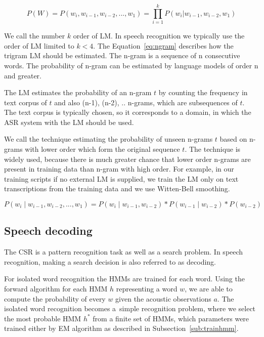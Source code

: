 {\begin{equation} \label{eq:lm}
    P(W)=P(w_i,  w_{i-1}, w_{i-2}, ..., w_1)=\prod_{i=1}^{k}{P(w_i|w_{i-1}, w_{i-2}, w_1)}
\end{equation}

We call the number $k$ order of \ac{LM}.
In speech recognition we typically use the order of \ac{LM} limited to $k<4$.
The Equation~\ref{eq:ngram} describes how the trigram \ac{LM} should be estimated.
The n-gram is a sequence of n consecutive words. The probability of n-gram can be estimated by language models
of order n and greater.

The \ac{LM} estimates the probability of an n-gram $t$ by counting the frequency in text corpus of $t$ and 
also (n-1), (n-2), .. n-grams, which are subsequences of $t$.
The text corpus is typically chosen, so it corresponds to a domain, in which the \ac{ASR} system 
with the \ac{LM} should be used.

We call the  technique estimating the probability of unseen n-grams $t$ 
based on n-grams with lower order which form the original sequence $t$.
The technique is widely used, because there is much greater chance that lower order n-grams are
present in training data than n-gram with high order.
For example, in our training scripts if no external \ac{LM} is supplied,
we train the \ac{LM} only on text transcriptions from the training data
and we use Witten-Bell smoothing.\cite{witten1991zero}

\begin{equation} \label{eq:ngram}
    P(w_i \mid w_{i-1}, w_{i-2}, ..., w_1) = P(w_i \mid w_{i-1}, w_{i-2}) * P(w_{i-1} \mid w_{i-2}) * P(w_{i-2})
\end{equation}

\subsection{Speech decoding}
\label{sub:decode}
The \ac{CSR} is a pattern recognition task as well as a search problem.
In speech recognition, making a search decision is also referred to as decoding.\cite{huang2001spoken}


For isolated word recognition the \acp{HMM} are trained for each word.
Using the forward algorithm for each \ac{HMM} $h$ representing a word $w$, 
we are able to compute the probability  of every $w$ given the acoustic observations $a$.
The isolated word recognition becomes a~simple recognition problem,
where we select the most probable \ac{HMM} $h^*$ from a finite set of \acp{HMM},
which parameters were trained either by \ac{EM} algorithm as described in Subsection~\ref{sub:trainhmm}.

}
